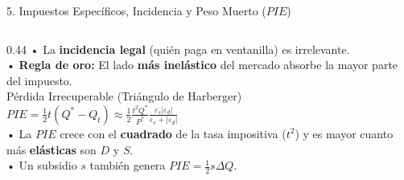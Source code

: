 \documentclass[aspectratio=169, 10pt]{beamer}
\begin{document}
\begin{frame}{5. Impuestos Específicos, Incidencia y Peso Muerto (\(PIE\))}
\begin{columns}[T]
    \begin{column}{0.44\textwidth}
      {\scriptsize
        • La \textbf{incidencia legal} (quién paga en ventanilla) es irrelevante.\\
        • \textbf{Regla de oro:} El lado \textbf{más inelástico} del mercado absorbe la mayor parte del impuesto.\\[4pt]
      }
      {\scriptsize\color{grisTexto}Pérdida Irrecuperable (Triángulo de Harberger)}\\[1pt]
      {\normalsize\color{rojoAcento}\textbf{\(PIE = \frac{1}{2} t (Q^* - Q_t) \approx \frac{1}{2}\frac{t^2 Q^*}{P^*} \frac{\varepsilon_s |\varepsilon_d|}{\varepsilon_s + |\varepsilon_d|}\)}}\\[5pt]
      {\scriptsize
        • La \(PIE\) crece con el \textbf{cuadrado} de la tasa impositiva (\(t^2\)) y es mayor cuanto más \textbf{elásticas} son \(D\) y \(S\).\\
        • Un subsidio \(s\) también genera \(PIE = \frac{1}{2} s \Delta Q\).
      }
    \end{column}
  \end{columns}

\end{frame}
\end{document}
